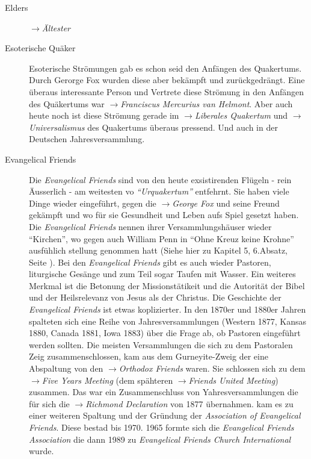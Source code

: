 \begin{description}
  \item[Elders] $\to$\textit{Ältester}

  \item[Esoterische Quäker] Esoterische Strömungen gab es schon seid den Anfängen
  des Quakertums. Durch Gerorge Fox wurden diese aber bekämpft und zurückgedrängt.
  Eine überaus interessante Person und Vertrete diese Strömung in den Anfängen
  des Quäkertums war $\to$\textit{Franciscus Mercurius van Helmont}. Aber auch
  heute noch ist diese Strömung gerade im $\to$\textit{Liberales Quakertum} und
  $\to$\textit{Universalismus} des Quakertums überaus pressend. Und auch in der
  Deutschen Jahresversammlung.

 \item[Evangelical Friends]
  Die \textit{Evangelical Friends} sind von den heute exsistirenden Flügeln -
  rein Äusserlich - am weitesten vo \textit{"`Urquakertum"'} entfehrnt. Sie haben
  viele Dinge wieder eingeführt, gegen die $\to$\textit{George Fox} und seine
  Freund gekämpft und wo für sie Gesundheit und Leben aufs Spiel gesetzt haben.
  Die \textit{Evangelical Friends} nennen ihrer Versammlungshäuser wieder
  "`Kirchen"', wo gegen auch William Penn in "`Ohne Kreuz keine Krohne"'
  ausfühlich stellung genommen hatt (Siehe hier zu Kapitel 5, 6.Absatz, Seite
  \pageref{kap5_ab6}). Bei den \textit{Evangelical Friends} gibt es auch wieder
  Pastoren, liturgische Gesänge und zum Teil sogar Taufen mit Wasser. Ein
  weiteres Merkmal ist die Betonung der Missionstätikeit und die Autorität der
  Bibel und der Heilsrelevanz von Jesus als der Christus.
\medskip 
  Die Geschichte der \textit{Evangelical Friends} ist etwas koplizierter. In
  den 1870er und 1880er Jahren spalteten sich eine Reihe von Jahresversammlungen
  (Western 1877, Kansas 1880, Canada 1881, Iowa 1883) über die Frage ab, ob
  Pastoren eingeführt werden sollten. Die meisten Versammlungen die sich zu dem
  Pastoralen Zeig zusammenschlossen, kam aus dem Gurneyite-Zweig der eine
  Abspaltung von den $\to$\textit{Orthodox Friends} waren. Sie schlossen sich
  zu dem $\to$\textit{Five Years Meeting} (dem spähteren $\to$\textit{Friends
  United Meeting}) zusammen. Das war ein Zusammenschluss von Yahresversammlungen
  die für sich die $\to$\textit{Richmond Declaration} von 1877 übernahmen.
 kam es zu einer weiteren Spaltung und der Gründung der
  \textit{Association of Evangelical Friends}. Diese bestad bis 1970. 1965
  formte sich die \textit{Evangelical Friends Association} die dann 1989 zu
  \textit{Evangelical Friends Church International} wurde.


\end{description}

